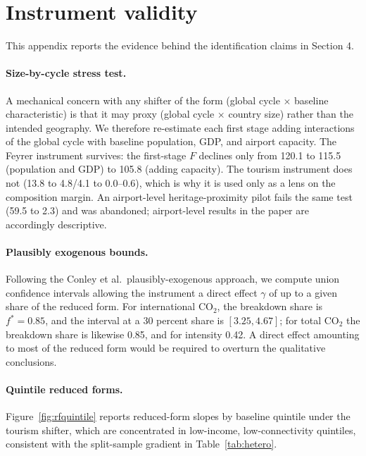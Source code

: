 \documentclass[12pt]{article}
\begin{document}
\section{Instrument validity}
This appendix reports the evidence behind the identification claims in
Section 4.

\paragraph{Size-by-cycle stress test.} A mechanical concern with any
shifter of the form (global cycle $\times$ baseline characteristic) is that
it may proxy (global cycle $\times$ country size) rather than the intended
geography. We therefore re-estimate each first stage adding interactions of
the global cycle with baseline population, GDP, and airport capacity. The
Feyrer instrument survives: the first-stage $F$ declines only from 120.1 to
115.5 (population and GDP) to 105.8 (adding capacity). The tourism
instrument does not (13.8 to 4.8/4.1 to 0.0--0.6), which is why it is used
only as a lens on the composition margin. An airport-level
heritage-proximity pilot fails the same test (59.5 to 2.3) and was
abandoned; airport-level results in the paper are accordingly descriptive.

\paragraph{Plausibly exogenous bounds.} Following the Conley et al.\
plausibly-exogenous approach, we compute union confidence intervals
allowing the instrument a direct effect $\gamma$ of up to a given share of
the reduced form. For international CO$_2$, the breakdown share is
$f^{*} = 0.85$, and the interval at a 30 percent share is $[3.25, 4.67]$;
for total CO$_2$ the breakdown share is likewise 0.85, and for intensity
0.42. A direct effect amounting to most of the reduced form would be
required to overturn the qualitative conclusions.

\paragraph{Quintile reduced forms.} Figure~\ref{fig:rfquintile} reports
reduced-form slopes by baseline quintile under the tourism shifter, which
are concentrated in low-income, low-connectivity quintiles, consistent with
the split-sample gradient in Table~\ref{tab:hetero}.

\end{document}
